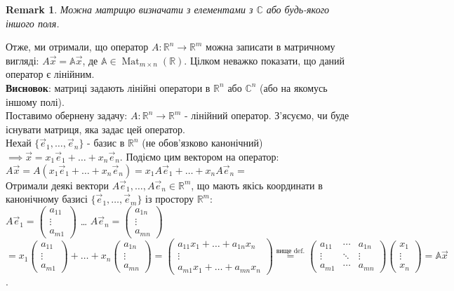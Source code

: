 \documentclass[a4paper, 10pt]{article}
\theoremstyle{theoremdd}
\newtheorem{remark}[theorem]{Remark}
\DeclareMathOperator{\Mat}{Mat}
\begin{document}
	\begin{remark}
	Можна матрицю визначати з елементами з $\mathbb{C}$ або будь-якого іншого поля. 
	\end{remark}
	\noindent
	Отже, ми отримали, що оператор $A \colon \mathbb{R}^n \to \mathbb{R}^m$ можна записати в матричному вигляді: $A\vec{x} = \mathbb{A} \vec{x}$, де $\mathbb{A} \in \Mat_{m \times n}(\mathbb{R})$. Цілком неважко показати, що даний оператор є лінійним. \\
	\textbf{Висновок}: матриці задають лінійні оператори в $\mathbb{R}^n$ або $\mathbb{C}^n$ (або на якомусь іншому полі).
	\bigskip \\
	Поставимо обернену задачу: $A \colon \mathbb{R}^n \to \mathbb{R}^m$ - лінійний оператор. З'ясуємо, чи буде існувати матриця, яка задає цей оператор.\\
	Нехай $\{\vec{e}_1,\dots, \vec{e}_n\}$ - базис в $\mathbb{R}^n$ (не обов'язково канонічний) $\implies \vec{x} = x_1\vec{e}_1 + \dots + x_n\vec{e}_n$. Подіємо цим вектором на оператор:\\
	$A\vec{x} = A(x_1\vec{e}_1 + \dots + x_n\vec{e}_n) = x_1A\vec{e}_1 + \dots + x_nA\vec{e}_n \boxed{=}$\\
	Отримали деякі вектори $A\vec{e}_1, \dots, A\vec{e}_n \in \mathbb{R}^m$, що мають якісь координати в канонічному базисі $\{ \vec{e}_1,\dots,\vec{e}_m\}$ із простору $\mathbb{R}^m$:\\
	$A\vec{e}_1 = \begin{pmatrix} a_{11} \\ \vdots \\ a_{m1} \end{pmatrix}$ \qquad \dots \qquad
	$A\vec{e}_n = \begin{pmatrix} a_{1n} \\ \vdots \\ a_{mn} \end{pmatrix}$\\
$\boxed{=} x_1 \begin{pmatrix} a_{11} \\ \vdots \\ a_{m1} \end{pmatrix} + \dots +x_n \begin{pmatrix} a_{1n} \\ \vdots \\ a_{mn} \end{pmatrix} = 	
\begin{pmatrix}
	a_{11}x_1 + \dots + a_{1n}x_n \\
	\vdots \\
	a_{m1}x_1 + \dots + a_{mn}x_n
	\end{pmatrix} \overset{\text{вище def.}}{=} \begin{pmatrix}
	a_{11} & \cdots &  a_{1n} \\
	\vdots & \ddots & \vdots \\
	a_{m1} & \cdots & a_{mn}
	\end{pmatrix} \begin{pmatrix}
	x_1 \\ \vdots \\ x_n
	\end{pmatrix} = \mathbb{A}\vec{x}$.\\
\end{document}
